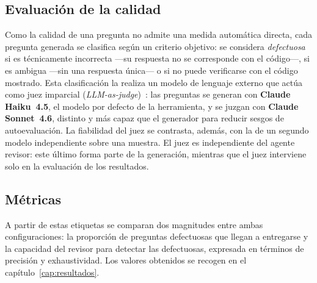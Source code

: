 \subsection{Evaluación de la calidad}

Como la calidad de una pregunta no admite una medida automática directa, cada
pregunta generada se clasifica según un criterio objetivo: se considera
\emph{defectuosa} si es técnicamente incorrecta ---su respuesta no se
corresponde con el código---, si es ambigua ---sin una respuesta única--- o si
no puede verificarse con el código mostrado. Esta clasificación la realiza un
modelo de lenguaje externo que actúa como juez imparcial
(\emph{LLM-as-judge})~\parencite{zheng2023llmjudge}: las preguntas se generan
con \textbf{Claude Haiku~4.5}, el modelo por defecto de la herramienta, y se
juzgan con \textbf{Claude Sonnet~4.6}, distinto y más capaz que el generador
para reducir sesgos de autoevaluación. La fiabilidad del juez se contrasta,
además, con la de un segundo modelo independiente sobre una muestra. El juez
es independiente del agente revisor: este último forma parte de la generación,
mientras que el juez interviene solo en la evaluación de los resultados.

\subsection{Métricas}

A partir de estas etiquetas se comparan dos magnitudes entre ambas
configuraciones: la proporción de preguntas defectuosas que llegan a
entregarse y la capacidad del revisor para detectar las defectuosas, expresada
en términos de precisión y exhaustividad. Los valores obtenidos se recogen en
el capítulo~\ref{cap:resultados}.
